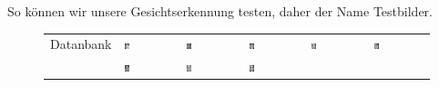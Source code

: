 So können wir unsere Gesichtserkennung testen, daher der Name \glqq{}Testbilder\grqq{}.
\begin{figure}[ht]
	\centering
	\begin{tabular}{|c m{2cm} m{2cm} m{2cm} m{2cm} m{2cm}|}
		\hline
		Datanbank &
		\includegraphics[width=0.1\textwidth]{images/recognition/training_faces/training_0} &
		\includegraphics[width=0.1\textwidth]{images/recognition/training_faces/training_1} &
		\includegraphics[width=0.1\textwidth]{images/recognition/training_faces/training_2} &
		\includegraphics[width=0.1\textwidth]{images/recognition/training_faces/training_3} &
		\includegraphics[width=0.1\textwidth]{images/recognition/training_faces/training_4} \\
		&
		\includegraphics[width=0.1\textwidth]{images/recognition/training_faces/training_5} &
		\includegraphics[width=0.1\textwidth]{images/recognition/training_faces/training_6} &
		\includegraphics[width=0.1\textwidth]{images/recognition/training_faces/training_7} &

\end{tabular}
\end{figure}
